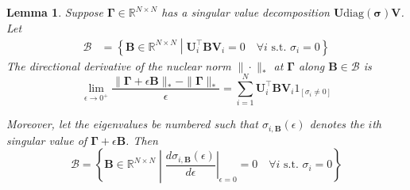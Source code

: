 \documentclass[12pt,letterpaper]{article}
\newtheorem{lemma}{Lemma}
\begin{document}
\begin{lemma}
	Suppose $\boldsymbol{\Gamma} \in \mathbb{R}^{N\times N}$ has a singular value decomposition $\boldsymbol{U}\text{diag}(\boldsymbol{\sigma})\boldsymbol{V}$.
	Let 
	\begin{align}
	\mathcal{B} & = 
	\left\{
	\boldsymbol{B} \in \mathbb{R}^{N \times N}
	\middle |
	{\boldsymbol{U}}_i^\top \boldsymbol{B} {\boldsymbol{V}}_i = 0 \quad \forall i \text{ s.t. } \sigma_i  = 0
	\right\}
	\end{align}
	The directional derivative of the nuclear norm $\| \cdot \|_*$ at $\boldsymbol{\Gamma}$ along $\boldsymbol{B} \in \mathcal{B}$ is
	\begin{equation}
	\lim_{\epsilon\rightarrow 0^+} \frac{\| \boldsymbol{\Gamma} + \epsilon\boldsymbol{B} \|_* - \| \boldsymbol{\Gamma} \|_*}{\epsilon}
	=
	\sum_{i=1}^N \boldsymbol{U}_i^\top \boldsymbol{B} \boldsymbol{V}_i 1_{[\sigma_i \ne 0]}
	\label{eq:direct_deriv_nuclear_norm}
	\end{equation}
	
	Moreover, let the eigenvalues be numbered such that $\sigma_{i, \boldsymbol{B}}(\epsilon)$ denotes the $i$th singular value of $\boldsymbol{\Gamma} + \epsilon \boldsymbol{B}$. Then
	\begin{equation}
	\mathcal{B} = \left \{
	\boldsymbol{B} \in \mathbb{R}^{N \times N}
	\middle |
	\left . \frac{d \sigma_{i, \boldsymbol{B}} (\epsilon )}{d\epsilon} \right |_{\epsilon = 0} = 0  \quad\forall i \text{ s.t. } \sigma_i= 0
	\right \}
	\label{eq:const_singular_values}
	\end{equation}
	
\end{lemma}
\end{document}

